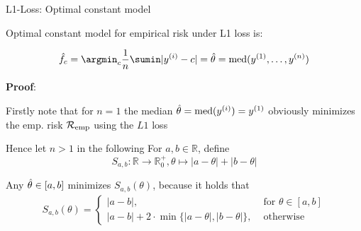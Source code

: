 \documentclass[11pt,compress,t,notes=noshow, xcolor=table]{beamer}
\begin{document}
\begin{frame2}[small]{L1-Loss: Optimal constant model}


Optimal constant model for empirical risk under L1 loss is:

$$\hat{f}_c = \argmin_{c} \frac{1}{n} \sumin |\yi -c| =\thetah = \text{med}(y^{(1)}, \ldots, y^{(n)}) $$  

\textbf{Proof}: 

\begin{itemizeS}
\item Firstly note that for $n = 1$ the median $\hat{\theta} = \text{med}(y^{(i)}) = y^{(1)}$ obviously minimizes the emp. risk $\mathcal{R}_{\text{emp}}$ using the $L1$ loss 

\item Hence let $n > 1$ in the following For $a,b \in \mathbb{R}$, define 
$$S_{a,b}:\mathbb{R} \rightarrow \mathbb{R}^+_0, \theta \mapsto |a- \theta| + |b-\theta|$$

Any $\hat{\theta} \in [a,b]$ minimizes $S_{a,b}(\theta)$, because it holds that
{\scriptsize
\begin{align*}
S_{a,b}(\theta) = \begin{cases}|a-b| ,& \text{ for } \theta \in [a,b]\\ |a-b| + 2\cdot\min\{|a-\theta|,|b-\theta|\}
,& \text{ otherwise}\end{cases}
\end{align*}
}
\end{itemizeS}
\vspace*{-0.4cm}

\end{frame2}
\end{document}
